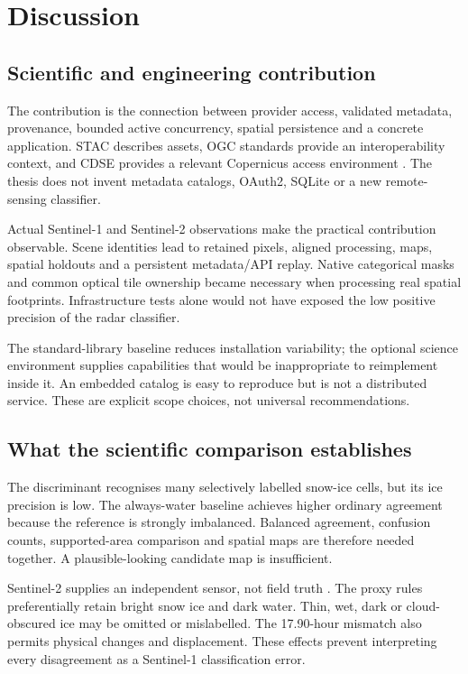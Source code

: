 \chapter{Discussion}

\section{Scientific and engineering contribution}

The contribution is the connection between provider access, validated metadata, provenance,
bounded active concurrency, spatial persistence and a concrete application. STAC describes assets,
OGC standards provide an interoperability context, and CDSE provides a relevant Copernicus
access environment \citep{stac-spec,ogc-api-features,cdse,kovacs2026cdse}. The thesis does
not invent metadata catalogs, OAuth2, SQLite or a new remote-sensing classifier.

Actual Sentinel-1 and Sentinel-2 observations make the practical contribution observable.
Scene identities lead to retained pixels, aligned processing, maps, spatial holdouts and
a persistent metadata/API replay. Native categorical masks and common optical tile ownership
became necessary when processing real spatial footprints. Infrastructure tests alone would
not have exposed the low positive precision of the radar classifier.

The standard-library baseline reduces installation variability; the optional science
environment supplies capabilities that would be inappropriate to reimplement inside it.
An embedded catalog is easy to reproduce but is not a distributed service. These are
explicit scope choices, not universal recommendations.

\section{What the scientific comparison establishes}

The discriminant recognises many selectively labelled snow-ice cells, but its ice precision
is low. The always-water baseline achieves higher ordinary agreement because the reference
is strongly imbalanced. Balanced agreement, confusion counts, supported-area comparison and
spatial maps are therefore needed together. A plausible-looking candidate map is insufficient.

Sentinel-2 supplies an independent sensor, not field truth \citep{drusch2012sentinel}.
The proxy rules preferentially retain bright snow ice and dark water. Thin, wet, dark or
cloud-obscured ice may be omitted or mislabelled. The 17.90-hour mismatch also permits
physical changes and displacement. These effects prevent interpreting every disagreement
as a Sentinel-1 classification error.

